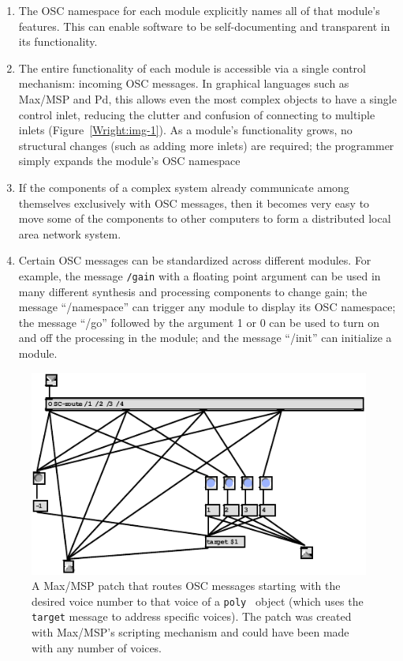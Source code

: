 \begin{enumerate}
	\item The OSC namespace for each module explicitly names all of that module's
features.  This can enable software to be self-documenting and transparent in its
functionality.
	\item The entire functionality of each module is accessible via a single control
mechanism: incoming OSC messages.  In graphical languages such as Max/MSP and Pd,
this allows even the most complex objects to have a single control inlet,
reducing the clutter and confusion of connecting to multiple inlets (Figure~\ref{Wright:img-1}).
As a module's functionality grows, no structural changes (such as adding more
inlets) are required; the programmer simply expands the module's OSC namespace
	\item If the components of a complex system already communicate among themselves
exclusively with OSC messages, then it becomes very easy to move some of the
components to other computers to form a distributed local area network system.
	\item Certain OSC messages can be standardized
across different modules.  For example, the message \texttt{/gain} with a floating
point argument can be used in many different synthesis and processing components
to change gain; the message ``/namespace'' can trigger any module to display its
OSC namespace; the message ``/go'' followed by the argument 1 or 0 can be used to
turn on and off the processing in the module; and the message ``/init'' can
initialize a module.
\end{enumerate}



\begin{figure}[t]
\centering
\includegraphics[width=\textwidth]{img-5-eps-converted-to-crop.pdf}
\caption{A Max/MSP patch that routes OSC messages starting with the desired voice number to that voice of a \texttt{poly~} object (which uses the \texttt{target} message to address specific voices). The patch was created with Max/MSP's scripting mechanism and could have been made with any number of voices.}
\label{Wright:img-5}       %
\end{figure}


